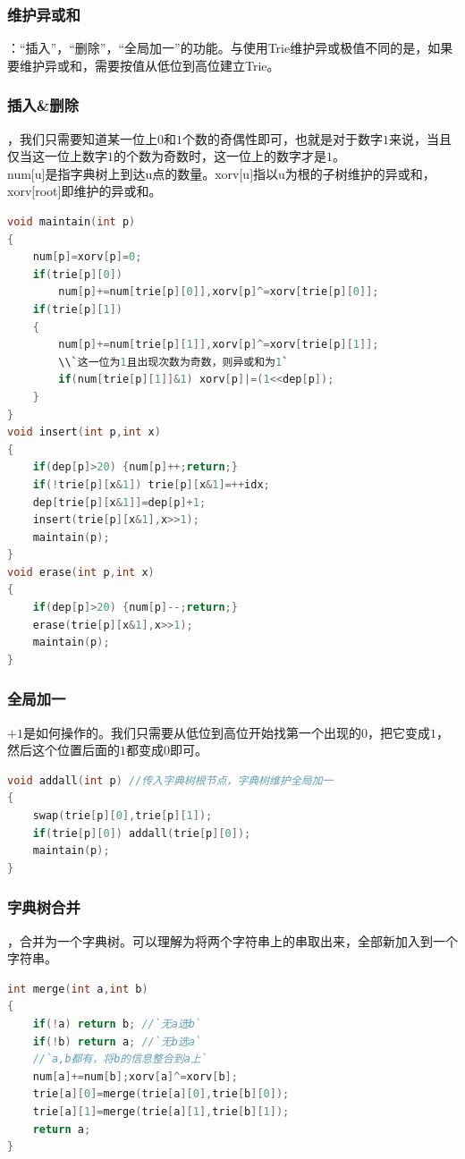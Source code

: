 \documentclass[a4paper]{book}
\begin{document}
\subsubsection{维护异或和}
：“插入”，“删除”，“全局加一”的功能。与使用Trie维护异或极值不同的是，如果要维护异或和，需要按值从低位到高位建立Trie。\\
\subsubsection{插入\&删除}
，我们只需要知道某一位上$0$和$1$个数的奇偶性即可，也就是对于数字$1$来说，当且仅当这一位上数字$1$的个数为奇数时，这一位上的数字才是$1$。\\
\indent num[u]是指字典树上到达u点的数量。xorv[u]指以u为根的子树维护的异或和，xorv[root]即维护的异或和。
\begin{lstlisting}[language=c++,escapeinside=``]
void maintain(int p)
{
    num[p]=xorv[p]=0;
    if(trie[p][0]) 
        num[p]+=num[trie[p][0]],xorv[p]^=xorv[trie[p][0]];
    if(trie[p][1])
    {
        num[p]+=num[trie[p][1]],xorv[p]^=xorv[trie[p][1]];
        \\`这一位为1且出现次数为奇数，则异或和为1`
        if(num[trie[p][1]]&1) xorv[p]|=(1<<dep[p]);
    }
}
void insert(int p,int x)
{
    if(dep[p]>20) {num[p]++;return;}
    if(!trie[p][x&1]) trie[p][x&1]=++idx;
    dep[trie[p][x&1]]=dep[p]+1;
    insert(trie[p][x&1],x>>1);
    maintain(p);
}
void erase(int p,int x)
{
    if(dep[p]>20) {num[p]--;return;}
    erase(trie[p][x&1],x>>1);
    maintain(p);
}
\end{lstlisting}
\subsubsection{全局加一}
$+1$是如何操作的。我们只需要从低位到高位开始找第一个出现的$0$，把它变成$1$，然后这个位置后面的$1$都变成$0$即可。
\begin{lstlisting}[language=c++,escapeinside=``]
void addall(int p) //传入字典树根节点，字典树维护全局加一
{
    swap(trie[p][0],trie[p][1]);
    if(trie[p][0]) addall(trie[p][0]);
    maintain(p);
}
\end{lstlisting}
\subsubsection{字典树合并}
，合并为一个字典树。可以理解为将两个字符串上的串取出来，全部新加入到一个字符串。
\begin{lstlisting}[language=c++,escapeinside=``]
int merge(int a,int b)
{
    if(!a) return b; //`无a选b`
    if(!b) return a; //`无b选a`
    //`a,b都有，将b的信息整合到a上`
    num[a]+=num[b];xorv[a]^=xorv[b];
    trie[a][0]=merge(trie[a][0],trie[b][0]);
    trie[a][1]=merge(trie[a][1],trie[b][1]);
    return a;
}
\end{lstlisting}
\end{document}
